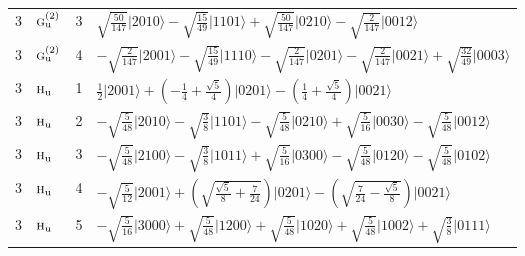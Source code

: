 \documentclass[11pt]{article}
\newcommand{\irr}[1]{\text{\normalfont\scshape #1}}
\newcommand{\ptag}[1]{\mathrm{#1}}
\newcommand{\occ}[1]{\lvert #1\rangle}
\begin{document}
\begin{longtable}{c l c p{}}
3 & $\irr{g}_{\ptag{u}}^{(2)}$ & 3 & $\sqrt{\tfrac{50}{147}}\occ{2010}-\sqrt{\tfrac{15}{49}}\occ{1101}+\sqrt{\tfrac{50}{147}}\occ{0210}-\sqrt{\tfrac{2}{147}}\occ{0012}$\\
3 & $\irr{g}_{\ptag{u}}^{(2)}$ & 4 & $-\sqrt{\tfrac{2}{147}}\occ{2001}-\sqrt{\tfrac{15}{49}}\occ{1110}-\sqrt{\tfrac{2}{147}}\occ{0201}-\sqrt{\tfrac{2}{147}}\occ{0021}+\sqrt{\tfrac{32}{49}}\occ{0003}$\\
3 & $\irr{h}_{\ptag{u}}$ & 1 & $\tfrac{1}{2}\occ{2001}+(- \frac{1}{4} + \frac{\sqrt{5}}{4})\occ{0201}-(\frac{1}{4} + \frac{\sqrt{5}}{4})\occ{0021}$\\
3 & $\irr{h}_{\ptag{u}}$ & 2 & $-\sqrt{\tfrac{5}{48}}\occ{2010}-\sqrt{\tfrac{3}{8}}\occ{1101}-\sqrt{\tfrac{5}{48}}\occ{0210}+\sqrt{\tfrac{5}{16}}\occ{0030}-\sqrt{\tfrac{5}{48}}\occ{0012}$\\
3 & $\irr{h}_{\ptag{u}}$ & 3 & $-\sqrt{\tfrac{5}{48}}\occ{2100}-\sqrt{\tfrac{3}{8}}\occ{1011}+\sqrt{\tfrac{5}{16}}\occ{0300}-\sqrt{\tfrac{5}{48}}\occ{0120}-\sqrt{\tfrac{5}{48}}\occ{0102}$\\
3 & $\irr{h}_{\ptag{u}}$ & 4 & $-\sqrt{\tfrac{5}{12}}\occ{2001}+(\sqrt{\frac{\sqrt{5}}{8} + \frac{7}{24}})\occ{0201}-(\sqrt{\frac{7}{24} - \frac{\sqrt{5}}{8}})\occ{0021}$\\
3 & $\irr{h}_{\ptag{u}}$ & 5 & $-\sqrt{\tfrac{5}{16}}\occ{3000}+\sqrt{\tfrac{5}{48}}\occ{1200}+\sqrt{\tfrac{5}{48}}\occ{1020}+\sqrt{\tfrac{5}{48}}\occ{1002}+\sqrt{\tfrac{3}{8}}\occ{0111}$\\
\hline
\end{longtable}
\end{document}
